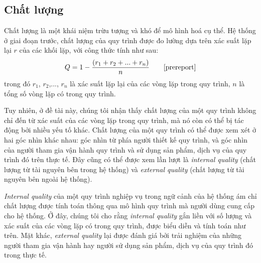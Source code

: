 \subsection{Chất lượng}
Chất lượng là một khái niệm trừu tượng và khó để mô hình hoá cụ thể. Hệ thống ở giai đoạn trước, chất lượng của quy trình được đo lường dựa trên xác suất lặp lại $r$ của các khối lặp, với công thức tính như sau:
\[ Q = 1 - \frac{(r_1 + r_2 + ... + r_n)}{n} \tag*{\cite{prereport}}\]
trong đó $r_1$, $r_2$,..., $r_n$ là xác suất lặp lại của các vòng lặp trong quy trình, $n$ là tổng số vòng lặp có trong quy trình.
\par
Tuy nhiên, ở đề tài này, chúng tôi nhận thấy chất lượng của một quy trình không chỉ đến từ xác suất của các vòng lặp trong quy trình, mà nó còn có thể bị tác động bởi nhiều yếu tố khác. Chất lượng của một quy trình có thể được xem xét ở hai góc nhìn khác nhau: góc nhìn từ phía người thiết kế quy trình, và góc nhìn của người tham gia vận hành quy trình và sử dụng sản phẩm, dịch vụ của quy trình đó trên thực tế. Đây cũng có thể được xem lần lượt là \emph{internal quality} (chất lượng từ tài nguyên bên trong hệ thống) và \emph{external quality} (chất lượng từ tài nguyên bên ngoài hệ thống).
\par
\emph{Internal quality} của một quy trình nghiệp vụ trong ngữ cảnh của hệ thống ám chỉ chất lượng được tính toán thông qua mô hình quy trình mà người dùng cung cấp cho hệ thống. Ở đây, chúng tôi cho rằng \emph{internal quality} gắn liền với số lượng và xác suất của các vòng lặp có trong quy trình, được biểu diễn và tính toán như trên. Mặt khác, \emph{external quality} lại được đánh giá bởi trải nghiệm của những người tham gia vận hành hay người sử dụng sản phẩm, dịch vụ của quy trình đó trong thực tế.